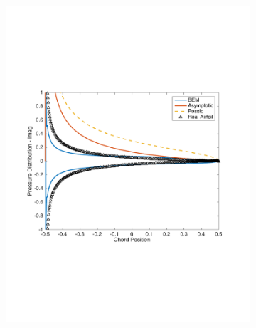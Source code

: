 \documentclass{article}
\begin{document}
\begin{figure}[h]
\begin{subfigure}{0.3\textwidth}
	\includegraphics[width = \textwidth, height=0.16\textheight]{NACA0003_pressure_k5imag}
\end{subfigure}%
\begin{subfigure}{0.33\textwidth}
	\centering

\end{subfigure}
\end{figure}
\end{document}
